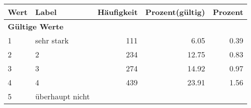      \begin{longtable}{lXrrr}
     \toprule
     \textbf{Wert} & \textbf{Label} & \textbf{Häufigkeit} & \textbf{Prozent(gültig)} & \textbf{Prozent} \\
     \endhead
     \midrule
     \multicolumn{5}{l}{\textbf{Gültige Werte}}\\

     1 &
     \multicolumn{1}{X}{ sehr stark   } &


       \num{111} &
       \num[round-mode=places,round-precision=2]{6.05} &
         \num[round-mode=places,round-precision=2]{0.39} \\

     2 &
     \multicolumn{1}{X}{ 2   } &


       \num{234} &
       \num[round-mode=places,round-precision=2]{12.75} &
         \num[round-mode=places,round-precision=2]{0.83} \\

     3 &
     \multicolumn{1}{X}{ 3   } &


       \num{274} &
       \num[round-mode=places,round-precision=2]{14.92} &
         \num[round-mode=places,round-precision=2]{0.97} \\

     4 &
     \multicolumn{1}{X}{ 4   } &


       \num{439} &
       \num[round-mode=places,round-precision=2]{23.91} &
         \num[round-mode=places,round-precision=2]{1.56} \\

     5 &
     \multicolumn{1}{X}{ überhaupt nicht   } &



\end{longtable}

